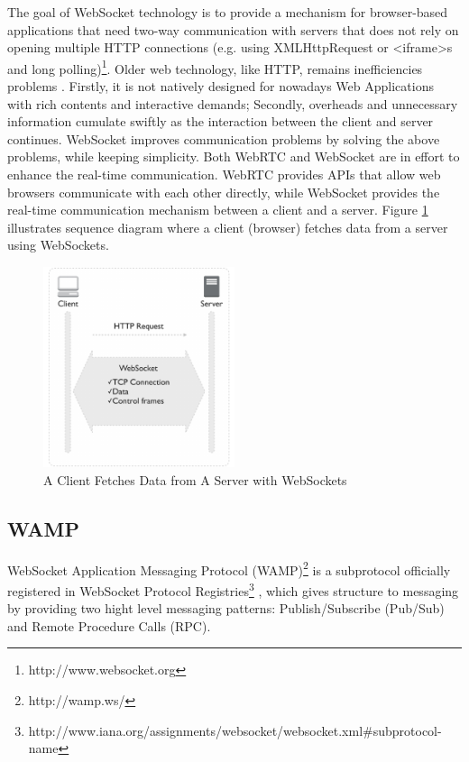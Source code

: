 The goal of WebSocket technology is to provide a mechanism for browser-based applications that need two-way communication with servers that does not rely on opening multiple HTTP connections (e.g. using XMLHttpRequest or <iframe>s and long polling)\footnote{http://www.websocket.org}. Older web technology, like HTTP, remains inefficiencies problems \cite{wang2012definitive}. Firstly, it is not natively designed for nowadays Web Applications with rich contents and interactive demands; Secondly, overheads and unnecessary information cumulate swiftly as the interaction between the client and server continues. WebSocket improves communication problems by solving the above problems, while keeping simplicity. Both WebRTC and WebSocket are in effort to enhance the real-time communication. WebRTC provides APIs that allow web browsers communicate with each other directly, while WebSocket provides the real-time communication mechanism between a client and a server. Figure \ref{fig:client-server-ws} illustrates sequence diagram where a client (browser) fetches data from a server using WebSockets.

\begin{figure}[t]
  \begin{center}
    \includegraphics[width=0.5\textwidth]{images/client-server-ws.pdf}
    \caption{A Client Fetches Data from A Server with WebSockets}
    \label{fig:client-server-ws}
  \end{center}
\end{figure}

\subsection{WAMP}

WebSocket Application Messaging Protocol (WAMP)\footnote{http://wamp.ws/} is a subprotocol officially registered in WebSocket Protocol Registries\footnote{http://www.iana.org/assignments/websocket/websocket.xml\#subprotocol-name} , which gives structure to messaging by providing two hight level messaging patterns: Publish/Subscribe (Pub/Sub) and Remote Procedure Calls (RPC).

